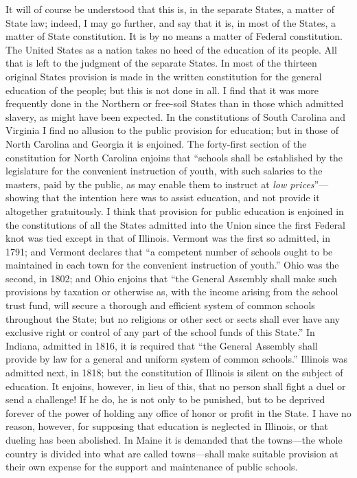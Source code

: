 It will of course be understood that this is, in the separate
States, a matter of State law; indeed, I may go further, and say
that it is, in most of the States, a matter of State constitution.
It is by no means a matter of Federal constitution.  The United
States as a nation takes no heed of the education of its people.
All that is left to the judgment of the separate States.  In most
of the thirteen original States provision is made in the written
constitution for the general education of the people; but this is
not done in all.  I find that it was more frequently done in the
Northern or free-soil States than in those which admitted slavery,
as might have been expected.  In the constitutions of South
Carolina and Virginia I find no allusion to the public provision
for education; but in those of North Carolina and Georgia it is
enjoined.  The forty-first section of the constitution for North
Carolina enjoins that ``schools shall be established by the
legislature for the convenient instruction of youth, with such
salaries to the masters, paid by the public, as may enable them to
instruct at \emph{low prices}''---showing that the intention here was to
assist education, and not provide it altogether gratuitously.  I
think that provision for public education is enjoined in the
constitutions of all the States admitted into the Union since the
first Federal knot was tied except in that of Illinois.  Vermont
was the first so admitted, in 1791; and Vermont declares that ``a
competent number of schools ought to be maintained in each town for
the convenient instruction of youth.''  Ohio was the second, in
1802; and Ohio enjoins that ``the General Assembly shall make such
provisions by taxation or otherwise as, with the income arising
from the school trust fund, will secure a thorough and efficient
system of common schools throughout the State; but no religions or
other sect or sects shall ever have any exclusive right or control
of any part of the school funds of this State.''  In Indiana,
admitted in 1816, it is required that ``the General Assembly shall
provide by law for a general and uniform system of common schools.''
Illinois was admitted next, in 1818; but the constitution of
Illinois is silent on the subject of education.  It enjoins,
however, in lieu of this, that no person shall fight a duel or send
a challenge!  If he do, he is not only to be punished, but to be
deprived forever of the power of holding any office of honor or
profit in the State.  I have no reason, however, for supposing that
education is neglected in Illinois, or that dueling has been
abolished.  In Maine it is demanded that the towns---the whole
country is divided into what are called towns---shall make suitable
provision at their own expense for the support and maintenance of
public schools.

